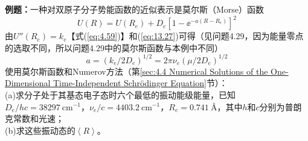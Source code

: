    \begin{examplebox}
        \textbf{例题：}一种对双原子分子势能函数的近似表示是莫尔斯（Morse）函数
        \begin{equation*}
            U\left(R\right) = U\left(R_e\right) + D_e\left[1 - \ee ^{-a\left(R-R_e\right)}\right]^2
        \end{equation*}
        由$U''\left(R_e\right) = k_e$【式(\ref{eq:4.59})】和(\ref{eq:13.27})可得（见问题4.29，因为能量零点的选取不同，所以问题4.29中的莫尔斯函数与本例中不同）
        \begin{equation*}
            a = \left(k_e/2D_e\right)^{1/2} = 2\pi\nu_e\left(\mu/2D_e\right)^{1/2}
        \end{equation*}
        使用莫尔斯函数和Numerov方法（第\ref{sec:4.4 Numerical Solutions of the One-Dimensional Time-Independent Schrödinger Equation}节）：\\
        (a)求分子处于其基态电子态时六个最低的振动能级能量，已知$D_e/hc = 38297 \:\mathrm{cm}^{-1}$，$\nu_e/c = 4403.2 \:\mathrm{cm}^{-1}$，$R_e = 0.741 \:\mathrm{Å}$，其中$h$和$c$分别为普朗克常数和光速；\\
        (b)求这些振动态的$\left\langle R \right\rangle$。
        \\


\end{examplebox}
